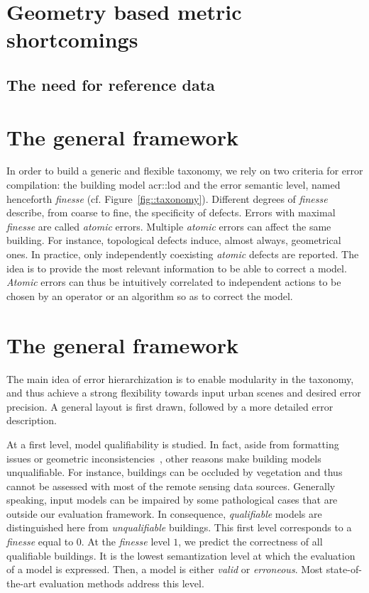 \minitoc
\section{Geometry based metric shortcomings}
    \subsection{The need for reference data}
   
\section{The general framework}
    In order to build a generic and flexible taxonomy, we rely on two criteria for error compilation: the building model \gls{acr::lod} and the error semantic level, named henceforth \textit{finesse} (cf. Figure~\ref{fig::taxonomy}). Different degrees of \textit{finesse} describe, from coarse to fine, the specificity of defects. Errors with maximal \textit{finesse} are called \textit{atomic} errors. Multiple \textit{atomic} errors can affect the same building. For instance, topological defects induce, almost always, geometrical ones. In practice, only independently coexisting \textit{atomic} defects are reported. The idea is to provide the most relevant information to be able to correct a model. \textit{Atomic} errors can thus be intuitively correlated to independent actions to be chosen by an operator or an algorithm so as to correct the model.

    \section{The general framework}
        The main idea of error hierarchization is to enable modularity in the taxonomy, and thus achieve a strong flexibility towards input urban scenes and desired error precision. A general layout is first drawn, followed by a more detailed error description.

        At a first level, model qualifiability is studied. In fact, aside from formatting issues or geometric inconsistencies~\parencite{ledoux2018val3dity}, other reasons make building models unqualifiable. For instance, buildings can be occluded by vegetation and thus cannot be assessed with most of the remote sensing data sources. Generally speaking, input models can be impaired by some pathological cases that are outside our evaluation framework. In consequence, \textit{qualifiable} models are distinguished here from \textit{unqualifiable} buildings. This first level corresponds to a \textit{finesse} equal to $0$. At the \textit{finesse} level $1$, we predict the correctness of all qualifiable buildings. It is the lowest semantization level at which the evaluation of a model is expressed. Then, a model is either \textit{valid} or \textit{erroneous}. Most state-of-the-art evaluation methods address this level.

